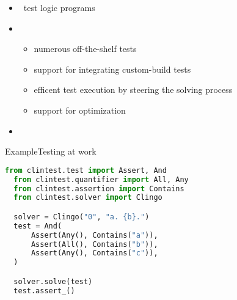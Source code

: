 \begin{frame}{\clintest}
  \begin{itemize}
  \item {} \ test logic programs
  \item {}
    \begin{itemize}
    \item numerous off-the-shelf tests
    \item support for integrating custom-build tests
    \item efficent test execution by steering the solving process
    \item support for optimization
    \end{itemize}
  \item {} \ \clingo
  \end{itemize}
\end{frame}
\begin{frame}[fragile]{Example}{Testing at work}
  \begin{lstlisting}[language=python,basicstyle=\small\ttfamily]
  from clintest.test import Assert, And
  from clintest.quantifier import All, Any
  from clintest.assertion import Contains
  from clintest.solver import Clingo

  solver = Clingo("0", "a. {b}.")
  test = And(
      Assert(Any(), Contains("a")),
      Assert(All(), Contains("b")),
      Assert(Any(), Contains("c")),
  )

  solver.solve(test)
  test.assert_()
  \end{lstlisting}
\end{frame}
%
